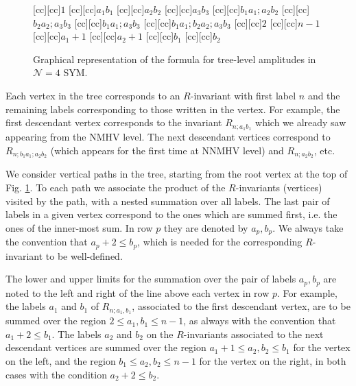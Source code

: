\documentclass[12pt]{article}
\begin{document}
{\begin{figure}
[cc][cc]{$1$}
[cc][cc]{$a_{1}b_{1}$}
[cc][cc]{$a_{2}b_{2}$}
[cc][cc]{$a_{3}b_{3}$}
[cc][cc]{$b_{1}a_{1};a_{2}b_{2}$}
[cc][cc]{$b_{2}a_{2};a_{3}b_{3}$}
[cc][cc]{$b_{1}a_{1};a_{3}b_{3}$}
[cc][cc]{$b_{1}a_{1};b_{2}a_{2};a_{3}b_{3}$}
[cc][cc]{$2$}
[cc][cc]{$n-1$}
[cc][cc]{$a_{1}+1$}
[cc][cc]{$a_{2}+1$}
[cc][cc]{$b_{1}$}
[cc][cc]{$b_{2}$}
 \centerline{{
}}  \caption[]{\small
  Graphical representation of the formula for tree-level amplitudes in
  $\mathcal{N}=4$ SYM.}
  \label{fig-rec-solution}
\end{figure}


Each vertex in the tree corresponds to an $R$-invariant with first
label $n$ and the remaining labels corresponding to
those written in the vertex. For example, the first descendant vertex corresponds to the invariant $R_{n;a_1b_1}$ which we already saw appearing from the NMHV level. The next descendant vertices correspond to $R_{n;b_1a_1;a_2b_2}$ (which appears for the first time at NNMHV level) and $R_{n;a_2b_2}$, etc.


We consider vertical paths in the tree,
starting from the root vertex at the top of Fig. \ref{fig-rec-solution}. To each path we associate the product of the
$R$-invariants (vertices) visited by the path, with a nested summation
over all labels. The last pair of labels in a given vertex correspond
to the ones which are summed first, i.e. the ones of the inner-most
sum. In row $p$ they are denoted by $a_p,b_p$. We always take the convention that $a_p + 2 \leq b_p$, which is needed for the corresponding $R$-invariant to be well-defined.

The lower and upper limits for the summation over the pair of labels $a_p,b_p$ are noted to the left and right of the line above each vertex in row $p$. For example, the labels $a_1$ and $b_1$ of $R_{n;a_1,b_1}$, associated to the first descendant vertex, are to be summed over the region $2\leq a_1,b_1 \leq n-1$, as always with the convention that $a_1+2 \leq b_1$. The labels $a_2$ and $b_2$ on the $R$-invariants associated to the next descendant vertices are summed over the region $a_1+1\leq a_2,b_2 \leq b_1$ for the vertex on the left, and the region $b_1 \leq a_2,b_2 \leq n-1$ for the vertex on the right, in both cases with the condition $a_2 +2 \leq b_2$.

}
\end{document}
